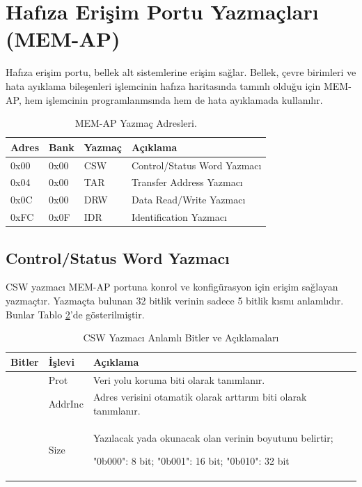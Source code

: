 \section{Hafıza Erişim Portu Yazmaçları (MEM-AP)}

Hafıza erişim portu, bellek alt sistemlerine erişim sağlar. Bellek, çevre birimleri ve hata ayıklama bileşenleri işlemcinin hafıza haritasında tamınlı olduğu için
\acrfull{MEM-AP}, hem işlemcinin programlanmsında hem de hata ayıklamada kullanılır.

\begin{table}[h]
\centering
\caption{MEM-AP Yazmaç Adresleri.}\label{tab:MemApReg}
\begin{tabular}{|l|l|l|l|}
	\hline
	Adres 	& Bank 	& Yazmaç & Açıklama \\ \hline
	0x00 	& 0x00 	& CSW 	& Control/Status Word Yazmacı \\ \hline
	0x04	& 0x00 & TAR 	& Transfer Address Yazmacı \\ \hline
	0x0C	& 0x00 & DRW 	& Data Read/Write Yazmacı \\ \hline
	0xFC	& 0x0F & IDR 	& Identification Yazmacı \\ \hline
\end{tabular}
\end{table}

\subsection{Control/Status Word Yazmacı}

CSW yazmacı \acrshort{MEM-AP} portuna konrol ve konfigürasyon için erişim sağlayan yazmaçtır. Yazmaçta bulunan 32 bitlik verinin sadece 5 bitlik kısmı anlamlıdır. Bunlar Tablo \ref{tab:csw}'de gösterilmiştir.

\begin{table}[h]
\centering
\caption{CSW Yazmacı Anlamlı Bitler ve Açıklamaları}\label{tab:csw}
	\begin{tabular}{|l|l|p{10cm}|}
	\hline
	Bitler  & İşlevi	& Açıklama \\ \hline
	[30:24] & Prot 		& Veri yolu koruma biti olarak tanımlanır. \\ \hline
	[5:4]   & AddrInc 	& Adres verisini otamatik olarak arttırım biti olarak tanımlanır. \\ \hline
	[2:0]   & Size 		& Yazılacak yada okunacak olan verinin boyutunu belirtir;

	"0b000": 8 bit; "0b001": 16 bit; "0b010": 32 bit \\ \hline

\end{tabular}
\end{table}

